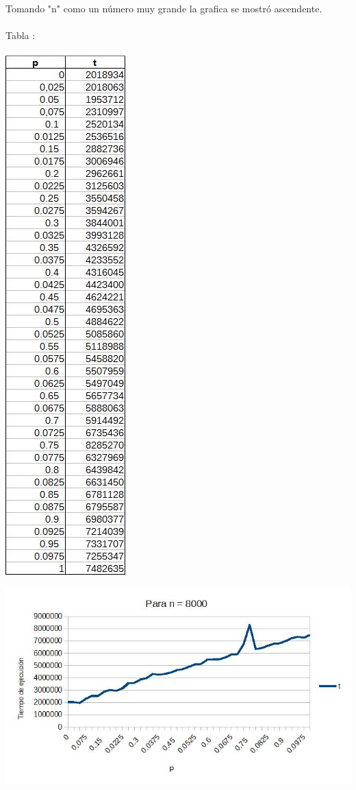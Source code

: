 \documentclass[12pt,letterpaper]{scrartcl}
\begin{document}
Tomando "n" como un número muy grande la grafica se mostró ascendente.
\\\\
Tabla :
\\\\
\includegraphics[scale=0.45]{1}

\includegraphics[scale=0.55]{nnnn}
\newpage
\end{document}
